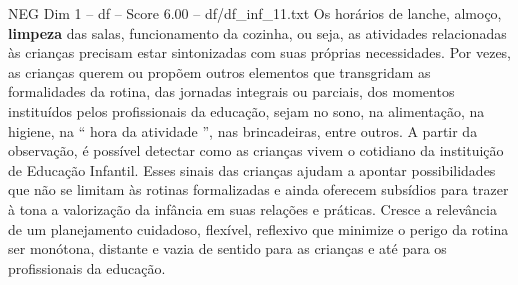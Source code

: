 \begin{textsample}{NEG Dim 1 – df – Score 6.00 – df/df\_inf\_11.txt}
Os horários de lanche, almoço, \textbf{limpeza} das salas, funcionamento da cozinha, ou seja, as atividades relacionadas às crianças precisam estar sintonizadas com suas próprias necessidades.
Por vezes, as crianças querem ou propõem outros elementos que transgridam as formalidades da rotina, das jornadas integrais ou parciais, dos momentos instituídos pelos profissionais da educação, sejam no sono, na alimentação, na higiene, na “ hora da atividade ”, nas brincadeiras, entre outros.
A partir da observação, é possível detectar como as crianças vivem o cotidiano da instituição de Educação Infantil.
Esses sinais das crianças ajudam a apontar possibilidades que não se limitam às rotinas formalizadas e ainda oferecem subsídios para trazer à tona a valorização da infância em suas relações e práticas.
Cresce a relevância de um planejamento cuidadoso, flexível, reflexivo que minimize o perigo da rotina ser monótona, distante e vazia de sentido para as crianças e até para os profissionais da educação.

\end{textsample}
